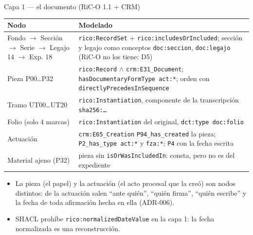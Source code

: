 \documentclass[aspectratio=169,10pt]{beamer}
\newcommand{\ttt}[1]{\texttt{\small #1}}
\begin{document}
\begin{frame}[shrink=4]{Capa 1 — el documento (RiC-O 1.1 + CRM)}
\footnotesize
\begin{tabular}{@{}p{4.6cm}p{8.6cm}@{}}
\toprule
Nodo & Modelado \\
\midrule
Fondo $\to$ Sección $\to$ Serie $\to$ Legajo 14 $\to$ Exp. 18 & \ttt{rico:RecordSet} + \ttt{rico:includesOrIncluded}; sección y legajo como conceptos \ttt{doc:seccion}, \ttt{doc:legajo} (RiC-O no los tiene: D5) \\
Pieza P00…P32 & \ttt{rico:Record} $\wedge$ \ttt{crm:E31\_Document}; \ttt{hasDocumentaryFormType act:*}; orden con \ttt{directlyPrecedesInSequence} \\
Tramo UT00…UT20 & \ttt{rico:Instantiation}, componente de la transcripción \ttt{sha256:…} \\
Folio (solo 4 marcas) & \ttt{rico:Instantiation} del original, \ttt{dct:type doc:folio} \\
Actuación & \ttt{crm:E65\_Creation} \ttt{P94\_has\_created} la pieza; \ttt{P2\_has\_type act:*} y \ttt{fza:*}; \ttt{P4} con la fecha \alert{escrita} \\
Material ajeno (P32) & pieza sin \ttt{isOrWasIncludedIn}: consta, pero no es del expediente \\
\bottomrule
\end{tabular}

\medskip
\begin{itemize}\footnotesize
\item La pieza (el papel) y la actuación (el acto procesal que la creó) son nodos distintos: de la actuación salen
      \enquote{ante quién}, \enquote{quién firma}, \enquote{quién escribe} y la fecha de toda afirmación hecha en ella
      (ADR-006).
\item SHACL prohíbe \ttt{rico:normalizedDateValue} en la capa 1: la fecha normalizada es una reconstrucción.
\end{itemize}
\end{frame}
\end{document}
